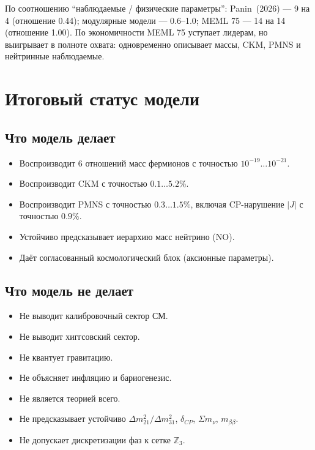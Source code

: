 \documentclass[11pt,a4paper]{article}
\numberwithin{equation}{section}
\begin{document}
По соотношению ``наблюдаемые / физические
параметры'': Panin~(2026) --- 9 на 4 (отношение 0.44);
модулярные модели --- 0.6--1.0;
MEML 75 --- 14 на 14 (отношение 1.00). По экономичности
MEML 75 уступает лидерам, но выигрывает в полноте
охвата: одновременно описывает массы, CKM, PMNS
и нейтринные наблюдаемые.

\section{Итоговый статус модели}

\subsection{Что модель делает}

\begin{itemize}[leftmargin=1.5em,itemsep=0.15em]
\item Воспроизводит 6 отношений масс фермионов
      с точностью $10^{-19}\ldots10^{-21}$.
\item Воспроизводит CKM с точностью $0.1\ldots 5.2\%$.
\item Воспроизводит PMNS с точностью $0.3\ldots 1.5\%$,
      включая CP-нарушение $|J|$ с точностью $0.9\%$.
\item Устойчиво предсказывает иерархию масс
      нейтрино (NO).
\item Даёт согласованный космологический блок
      (аксионные параметры).
\end{itemize}

\subsection{Что модель не делает}

\begin{itemize}[leftmargin=1.5em,itemsep=0.15em]
\item Не выводит калибровочный сектор СМ.
\item Не выводит хиггсовский сектор.
\item Не квантует гравитацию.
\item Не объясняет инфляцию и бариогенезис.
\item Не является теорией всего.
\item Не предсказывает устойчиво
      $\Delta m^2_{21}/\Delta m^2_{31}$,
      $\delta_{CP}$, $\Sigma m_\nu$, $m_{\beta\beta}$.
\item Не допускает дискретизации фаз
      к сетке $\mathbb{Z}_3$.
\end{itemize}
\end{document}
